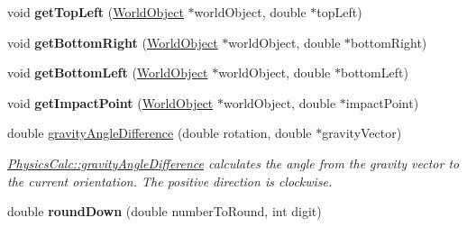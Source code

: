 \begin{DoxyCompactItemize}
\item 
void {\bfseries get\+Top\+Left} (\hyperlink{class_world_object}{World\+Object} $\ast$world\+Object, double $\ast$top\+Left)\hypertarget{class_physics_calc_a518d1c85e39c54bd349e02659c92b134}{}\label{class_physics_calc_a518d1c85e39c54bd349e02659c92b134}

\item 
void {\bfseries get\+Bottom\+Right} (\hyperlink{class_world_object}{World\+Object} $\ast$world\+Object, double $\ast$bottom\+Right)\hypertarget{class_physics_calc_af118ca721ecccebab2c88e53b7471320}{}\label{class_physics_calc_af118ca721ecccebab2c88e53b7471320}

\item 
void {\bfseries get\+Bottom\+Left} (\hyperlink{class_world_object}{World\+Object} $\ast$world\+Object, double $\ast$bottom\+Left)\hypertarget{class_physics_calc_a9a74039e739a8649547c6d2f8aaf7fab}{}\label{class_physics_calc_a9a74039e739a8649547c6d2f8aaf7fab}

\item 
void {\bfseries get\+Impact\+Point} (\hyperlink{class_world_object}{World\+Object} $\ast$world\+Object, double $\ast$impact\+Point)\hypertarget{class_physics_calc_a9bbfe3998836451d84697577c0e6195d}{}\label{class_physics_calc_a9bbfe3998836451d84697577c0e6195d}

\item 
double \hyperlink{class_physics_calc_a515dcab8395108cb37b7526adbab6ed0}{gravity\+Angle\+Difference} (double rotation, double $\ast$gravity\+Vector)
\begin{DoxyCompactList}\small\item\em \hyperlink{class_physics_calc_a515dcab8395108cb37b7526adbab6ed0}{Physics\+Calc\+::gravity\+Angle\+Difference} calculates the angle from the gravity vector to the current orientation. The positive direction is clockwise. \end{DoxyCompactList}\item 
double {\bfseries round\+Down} (double number\+To\+Round, int digit)\hypertarget{class_physics_calc_a7e24e0769598a509705a71a0c4e8ab5d}{}\label{class_physics_calc_a7e24e0769598a509705a71a0c4e8ab5d}


\end{DoxyCompactItemize}
